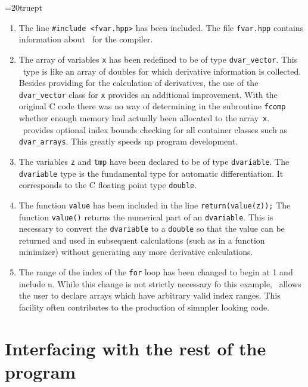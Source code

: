 \documentclass[12pt]{book}
\begin{document}
{\parindent=20truept
\begin{enumerate}
\item The line {\tt \#include <fvar.hpp>} has been included. The file
{\tt fvar.hpp}
contains information about \hbox{\AD}\ for the \cplus compiler.

\item The array of variables {\tt x} has been 
redefined to be of type {\tt dvar\_vector}. This \AD\ type is like
an array of doubles for which derivative information is collected. 
Besides providing for the calculation of derivatives, the use of the 
{\tt dvar\_vector} class for {\tt x} provides an additional improvement.
With the original C code there was no way of determining in the subroutine
{\tt fcomp} whether
enough memory had actually been allocated to the array~{\tt x}.
\AD\ provides optional index bounds checking for all container
classes such as {\tt dvar\_arrays}. This greatly speeds up 
program development.

\item The variables {\tt z} and {\tt tmp} have been declared to be
of type {\tt dvariable}.  The {\tt dvariable} type
is the fundamental type for automatic differentiation. It corresponds
to the C floating point type {\tt double}.

\item The function {\tt value} has been included
in the line {\tt return(value(z));}
The function  {\tt value()} returns the numerical part of an
{\tt dvariable}. This is necessary to convert the {\tt dvariable}
to a {\tt double} so that the value can be returned and used in
subsequent calculations (such as in a function minimizer) without
generating any more derivative calculations.

\item The range of the index of the {\tt for} loop has been changed
to begin at 1 and include n. While this change is not strictly necessary
fo this example,
\AD\ allows the user to declare arrays which have arbitrary valid
index ranges. This facility often contributes to the production 
of simnpler looking code.
\end{enumerate}

\par}

\section{Interfacing with the rest of the program}
\end{document}
